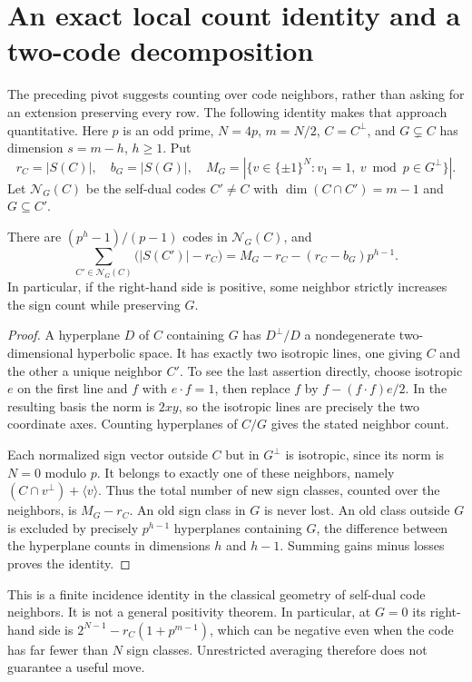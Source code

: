 \section{An exact local count identity and a two-code decomposition}
\label{sec:neighbor-counts}

The preceding pivot suggests counting over code neighbors, rather
than asking for an extension preserving every row. The following
identity makes that approach quantitative. Here $p$ is an odd prime,
$N=4p$, $m=N/2$, $C=C^\perp$, and $G\subsetneq C$ has dimension
$s=m-h$, $h\ge1$. Put
\[
 r_C=|S(C)|,\quad b_G=|S(G)|,\quad
 M_G=|\{v\in\{\pm1\}^N:v_1=1,\ v\bmod p\in G^\perp\}|.
\]
Let $\mathcal N_G(C)$ be the self-dual codes $C'\ne C$ with
$\dim(C\cap C')=m-1$ and $G\subseteq C'$.

\begin{theorem}
\label{code:neighbor-average}
There are $(p^h-1)/(p-1)$ codes in $\mathcal N_G(C)$, and
\[
 \boxed{\quad
 \sum_{C'\in\mathcal N_G(C)}\bigl(|S(C')|-r_C\bigr)
 =M_G-r_C-(r_C-b_G)p^{h-1}.\quad}
\]
In particular, if the right-hand side is positive, some neighbor
strictly increases the sign count while preserving $G$.
\end{theorem}
\begin{proof}
A hyperplane $D$ of $C$ containing $G$ has $D^\perp/D$ a nondegenerate
two-dimensional hyperbolic space. It has exactly two isotropic lines,
one giving $C$ and the other a unique neighbor $C'$.
To see the last assertion directly, choose isotropic $e$ on the first
line and $f$ with $e\cdot f=1$, then replace $f$ by
$f-(f\cdot f)e/2$. In the resulting basis the norm is $2xy$,
so the isotropic lines are precisely the two coordinate axes.
Counting hyperplanes of $C/G$ gives the stated neighbor count.

Each normalized sign vector outside $C$ but in $G^\perp$ is isotropic,
since its norm is $N=0$ modulo $p$. It belongs to exactly one of
these neighbors, namely
$(C\cap v^\perp)+\langle v\rangle$. Thus the total number of
new sign classes, counted over the neighbors, is $M_G-r_C$.
An old sign class in $G$ is never lost. An old class outside $G$
is excluded by precisely $p^{h-1}$ hyperplanes containing $G$,
the difference between the hyperplane counts in dimensions
$h$ and $h-1$. Summing gains minus losses proves the identity.
\end{proof}

This is a finite incidence identity in the classical geometry of
self-dual code neighbors. It is not a general positivity theorem.
In particular, at $G=0$ its right-hand side is
$2^{N-1}-r_C(1+p^{m-1})$, which can be negative even when the
code has far fewer than $N$ sign classes. Unrestricted averaging
therefore does not guarantee a useful move.

